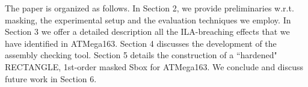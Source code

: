 The paper is organized as follows. In Section 2, we provide preliminaries w.r.t. masking, the experimental setup and the evaluation techniques we employ. In Section 3 we offer a detailed description all the ILA-breaching effects that we have identified in ATMega163. Section 4 discusses the development of the assembly checking tool. Section 5 details the construction of a ``hardened" RECTANGLE, 1st-order masked Sbox for ATMega163. We conclude and discuss future work in Section 6.


